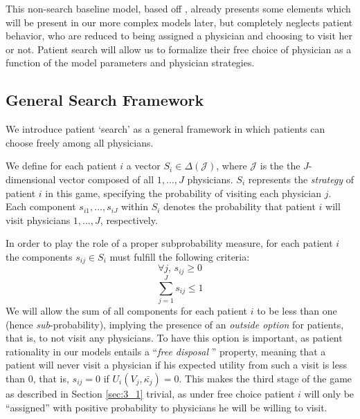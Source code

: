 \documentclass[../main.tex]{subfiles}
\begin{document}
This non-search baseline model, based off \cite{schnell2017physician}, already presents some elements which will be present in our more complex models later, but completely neglects patient behavior, who are reduced to being assigned a physician and choosing to visit her or not. Patient search will allow us to formalize their free choice of physician as a function of the model parameters and physician strategies.


\subsection{General Search Framework}

We introduce patient `search' as a general framework in which patients can choose freely among all physicians.

We define for each patient $i$ a vector $S_i \in \Delta(\mathcal{J})$, where $\mathcal{J}$ is the the $J$-dimensional vector composed of all $1, ..., J$ physicians. $S_i$ represents the \textit{strategy} of patient \( i \) in this game, specifying the probability of visiting each physician \( j \). Each component \( s_{i1}, \ldots, s_{iJ} \) within \( S_i \) denotes the probability that patient \( i \) will visit physicians \( 1, \ldots, J \), respectively.


In order to play the role of a proper subprobability measure, for each patient $i$ the components $s_{ij} \in S_i$ must fulfill the following criteria:
\begin{equation} \tag{i}
    \forall j, \, s_{ij} \geq 0
\end{equation}
\begin{equation} \tag{ii}
    \sum_{j = 1}^{J} s_{ij} \leq 1
\end{equation}
We will allow the sum of all components for each patient $i$ to be less than one (hence \textit{sub}-probability), implying the presence of an \textit{outside option} for patients, that is, to not visit any physicians. To have this option is important, as patient rationality in our models entails a  ``\textit{free disposal} \hspace{-0.1cm}'' property, meaning that a patient will never visit a physician if his expected utility from such a visit is less than $0$, that is, $s_{ij} = 0$ if $U_i(V_j,\bar{\kappa_j}) = 0$. This makes the third stage of the game as described in Section \ref{sec:3_1} trivial, as under free choice patient $i$ will only be ``assigned'' with positive probability to physicians he will be willing to visit.
\end{document}
